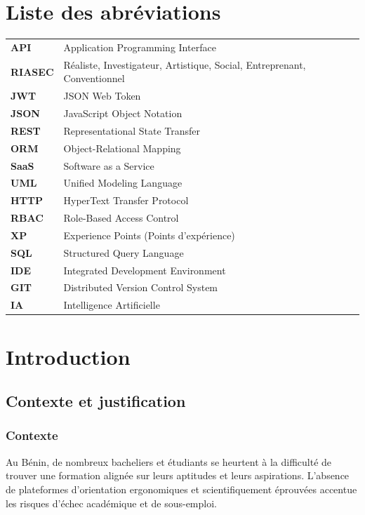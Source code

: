\documentclass[12pt,a4paper]{report}
\begin{document}
\listoftables
{}
\newpage

\chapter*{Liste des abréviations}
\begin{tabular}{ll}
\textbf{API} & Application Programming Interface \\
\textbf{RIASEC} & Réaliste, Investigateur, Artistique, Social, Entreprenant, Conventionnel \\
\textbf{JWT} & JSON Web Token \\
\textbf{JSON} & JavaScript Object Notation \\
\textbf{REST} & Representational State Transfer \\
\textbf{ORM} & Object-Relational Mapping \\
\textbf{SaaS} & Software as a Service \\
\textbf{UML} & Unified Modeling Language \\
\textbf{HTTP} & HyperText Transfer Protocol \\
\textbf{RBAC} & Role-Based Access Control \\
\textbf{XP} & Experience Points (Points d'expérience) \\
\textbf{SQL} & Structured Query Language \\
\textbf{IDE} & Integrated Development Environment \\
\textbf{GIT} & Distributed Version Control System \\
\textbf{IA} & Intelligence Artificielle \\
\end{tabular}
\newpage

\chapter{Introduction}
\minitoc
\newpage

\section{Contexte et justification}
\subsection{Contexte}
Au Bénin, de nombreux bacheliers et étudiants se heurtent à la difficulté de trouver une formation alignée sur leurs aptitudes et leurs aspirations. L'absence de plateformes d'orientation ergonomiques et scientifiquement éprouvées accentue les risques d'échec académique et de sous-emploi.
\end{document}
